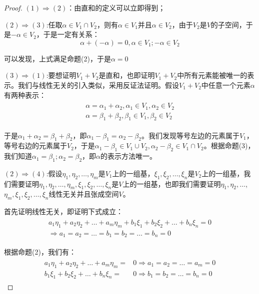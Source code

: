     \begin{proof}
    $(1)\Rightarrow(2)$：由直和的定义可以立即得到；
    
    $(2)\Rightarrow(3)$:任取$\alpha\in V_1\cap V_2$，则有$\alpha\in V_1\textrm{并且}\alpha\in V_2$，由于$V_2$是$V$的子空间，于是$-\alpha\in V_2$，于是一定有关系：
    \begin{equation}
        \alpha +(-\alpha)=0 ,\alpha\in V_1;-\alpha\in V_2
    \end{equation}
    
    可以发现，上式满足命题(2)，于是$\alpha=0$
    
    $(3)\Rightarrow(1)$:要想证明$V_1+V_2$是直和，也即证明$V_1+V_2$中所有元素能被唯一的表示。我们与线性无关的引入类似，采用反证法证明。假设$V_1+V_2$中任意一个元素$\alpha$有两种表示：
    \begin{align}
        \begin{split}
            \alpha=\alpha_1+\alpha_2,\alpha_1\in V_1,\alpha_2\in V_2\\
            \alpha=\beta_1+\beta_2,\beta_1\in V_1,\beta_2\in V_2
        \end{split}
    \end{align}
       
    于是$\alpha_1+\alpha_2=\beta_1+\beta_2$，即$\alpha_1-\beta_1=\alpha_2-\beta_2$。我们发现等号左边的元素属于$V_1$，等号右边的元素属于$V_2$，于是$\alpha_1-\beta_1\in V_1\cup V_2,\alpha_2-\beta_2\in V_1\cap V_2$。根据命题(3)，我们知道$\alpha_1=\beta_1;\alpha_2=\beta_2$，即$\alpha$的表示方法唯一。
    
    $(2)\Rightarrow(4)$:假设$\eta_1,\eta_2,\dots,\eta_m$是$V_1$上的一组基，$\xi_1,\xi_2,\dots,\xi_n$是$V_2$上的一组基，我们需要证明$\eta_1,\eta_2,\dots,\eta_m,\xi_1,\xi_2,\dots,\xi_n$是$V$上的一组基，也即我们需要证明$\eta_1,\eta_2,\dots$,\\$\eta_m,\xi_1,\xi_2,\dots,\xi_n$线性无关并且张成空间$V$。
    
    首先证明线性无关，即证明下式成立：
    \begin{align}\label{equA:equ}
        \begin{split}
             a_1\eta_1+a_2\eta_2+\dots+a_m\eta_m+b_1\xi_1+b_2\xi_2+\dots+b_n\xi_n=0\\
             \Rightarrow a_1=a_2=\dots=b_1=b_2=\dots=b_n=0
        \end{split}
    \end{align}
       

    
    根据命题(2)，我们有：
    \begin{align}
        \begin{split}
            a_1\eta_1+a_2\eta_2+\dots+a_m\eta_m=&0\Rightarrow a_1=a_2=\dots=a_m=0\\
            b_1\xi_1+b_2\xi_2+\dots+b_n\xi_n=&0 \Rightarrow b_1=b_2=\dots=b_n=0
        \end{split}
    \end{align}
    

\end{proof}
